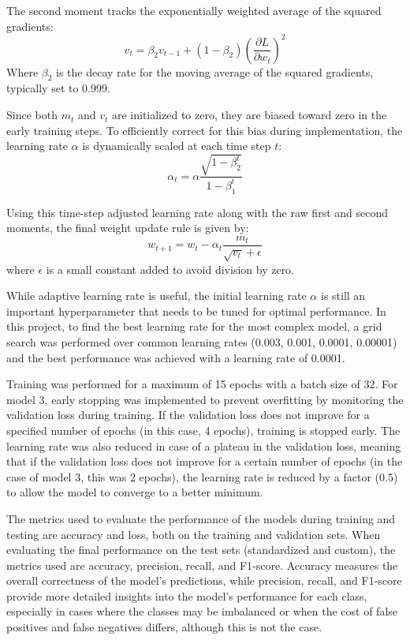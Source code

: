 \documentclass[runningheads]{llncs}
\begin{document}
The second moment tracks the exponentially weighted average of the squared gradients:
\[
v_t = \beta_2 v_{t-1} + (1 - \beta_2)\left(\frac{\partial L}{\partial w_t}\right)^2
\]
Where $\beta_2$ is the decay rate for the moving average of the squared gradients, typically set to 0.999.

Since both $m_t$ and $v_t$ are initialized to zero, they are biased toward zero in the early training steps. To efficiently correct for this bias during implementation, the learning rate $\alpha$ is dynamically scaled at each time step $t$:
\[
\alpha_t = \alpha \frac{\sqrt{1 - \beta_2^{t}}}{1 - \beta_1^{t}}
\]

Using this time-step adjusted learning rate along with the raw first and second moments, the final weight update rule is given by:
\[
w_{t+1} = w_t - \alpha_t \frac{m_t}{\sqrt{v_t} + \epsilon}
\]
where $\epsilon$ is a small constant added to avoid division by zero.

While adaptive learning rate is useful, the initial learning rate $\alpha$ is still an important hyperparameter that needs to be tuned for optimal performance. In this project, to find the best learning rate for the most complex model, a grid search was performed over common learning rates (0.003, 0.001, 0.0001, 0.00001) and the best performance was achieved with a learning rate of 0.0001.


Training was performed for a maximum of 15 epochs with a batch size of 32.
For model 3, early stopping was implemented to prevent overfitting by monitoring the validation loss during training. If the validation loss does not improve for a specified number of epochs (in this case, 4 epochs), training is stopped early. The learning rate was also reduced in case of a plateau in the validation loss, meaning that if the validation loss does not improve for a certain number of epochs (in the case of model 3, this was 2 epochs), the learning rate is reduced by a factor (0.5) to allow the model to converge to a better minimum.

The metrics used to evaluate the performance of the models during training and testing are accuracy and loss, both on the training and validation sets. When evaluating the final performance on the test sets (standardized and custom), the metrics used are accuracy, precision, recall, and F1-score. Accuracy measures the overall correctness of the model's predictions, while precision, recall, and F1-score provide more detailed insights into the model's performance for each class, especially in cases where the classes may be imbalanced or when the cost of false positives and false negatives differs, although this is not the case.
\end{document}
